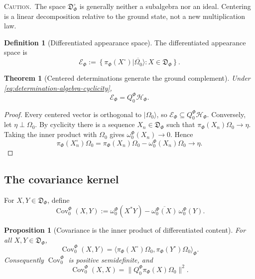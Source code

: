 \documentclass[11pt,reqno]{scrartcl}
\newcommand{\scrHF}{\mathscr H_{\Phi}}
\newcommand{\piF}{\pi_{\Phi}}
\newcommand{\omegaF}{\omega_{0}^{\Phi}}
\newcommand{\QzeroF}{Q_{0}^{\Phi}}
\newcommand{\ket}[1]{\lvert #1\rangle}
\newcommand{\inner}[2]{\langle #1,#2\rangle}
\newcommand{\warninglabel}{\par\smallskip\noindent\textsc{Caution.}\ }
\newcommand{\detAlg}{\mathfrak D_{\Phi}}
\newcommand{\centDet}{\mathfrak D_{\Phi}^{\circ}}
\newcommand{\appSpace}{\mathscr E_{\Phi}}
\DeclareMathOperator{\Cov}{Cov}
\theoremstyle{plain}
\newtheorem{theorem}{Theorem}[section]
\newtheorem{proposition}[proposition]{Proposition}
\theoremstyle{definition}
\newtheorem{definition}[definition]{Definition}
\theoremstyle{remark}
\begin{document}
\warninglabel The space $\centDet$ is generally neither a subalgebra nor an
ideal.  Centering is a linear decomposition relative to the ground state, not
a new multiplication law.

\begin{definition}[Differentiated appearance space]
\label{def:differentiated-appearance-space}
The differentiated appearance space is
\begin{equation}
  \boxed{
  \appSpace
  :=\overline{
      \left\{
        \piF(X^{\circ})\ket{\Omega_0}:
        X\in\detAlg
      \right\}
    }.}
  \label{eq:differentiated-appearance-space}
\end{equation}
\end{definition}

\begin{theorem}[Centered determinations generate the ground complement]
\label{thm:centered-generates-ground-complement}
Under \eqref{eq:determination-algebra-cyclicity},
\begin{equation}
  \boxed{
  \appSpace=\QzeroF\scrHF.}
  \label{eq:appearance-space-ground-complement}
\end{equation}
\end{theorem}

\begin{proof}
Every centered vector is orthogonal to $\ket{\Omega_0}$, so
$\appSpace\subseteq\QzeroF\scrHF$.  Conversely, let $\eta\perp\Omega_0$.
By cyclicity there is a sequence $X_n\in\detAlg$ such that
$\piF(X_n)\Omega_0\to\eta$.  Taking the inner product with $\Omega_0$ gives
$\omegaF(X_n)\to0$.  Hence
\begin{equation}
  \piF(X_n^{\circ})\Omega_0
  =\piF(X_n)\Omega_0-\omegaF(X_n)\Omega_0
  \longrightarrow\eta.
\end{equation}
\end{proof}

\subsection{The covariance kernel}

For $X,Y\in\detAlg$, define
\begin{equation}
  \boxed{
  \Cov_{0}^{\Phi}(X,Y)
  :=\omegaF(X^*Y)
   -\overline{\omegaF(X)}\,\omegaF(Y).}
  \label{eq:phenomenal-covariance-kernel}
\end{equation}

\begin{proposition}[Covariance is the inner product of differentiated content]
\label{prop:covariance-content-inner-product}
For all $X,Y\in\detAlg$,
\begin{equation}
  \Cov_{0}^{\Phi}(X,Y)
  =\inner{\piF(X^{\circ})\Omega_0}
          {\piF(Y^{\circ})\Omega_0}_{\Phi}.
  \label{eq:covariance-content-identity}
\end{equation}
Consequently $\Cov_{0}^{\Phi}$ is positive semidefinite, and
\begin{equation}
  \Cov_{0}^{\Phi}(X,X)
  =\|\QzeroF\piF(X)\Omega_0\|^2.
  \label{eq:covariance-appearance-norm}
\end{equation}
\end{proposition}
\end{document}
